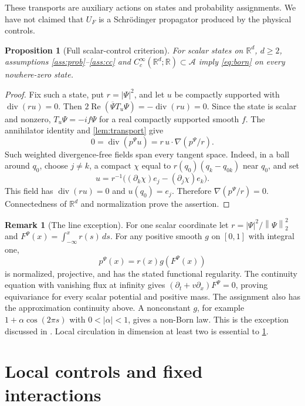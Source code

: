 \documentclass[11pt]{article}
\numberwithin{equation}{section}
\newtheorem{proposition}[proposition]{Proposition}
\theoremstyle{definition}
\newtheorem{remark}[remark]{Remark}
\newcommand{\R}{\mathbb R}
\newcommand{\Cc}{C_c^\infty}
\newcommand{\Acal}{\mathcal A}
\newcommand{\diver}{\operatorname{div}}
\newcommand{\norm}[1]{\left\|#1\right\|}
\begin{document}
These transports are auxiliary actions on states and probability assignments. We have not claimed that \(U_F\) is a Schr\"odinger propagator produced by the physical controls.

\begin{proposition}[Full scalar-control criterion]\label{prop:saturation}
For scalar states on \(\R^d\), \(d\ge2\), assumptions \ref{ass:prob}--\ref{ass:cc} and
\(\Cc(\R^d;\R)\subset\Acal\) imply \eqref{eq:born} on every nowhere-zero state.
\end{proposition}

\begin{proof}
Fix such a state, put \(r=|\Psi|^2\), and let \(u\) be compactly supported with \(\diver(ru)=0\). Then
\(2\operatorname{Re}(\overline\Psi T_u\Psi)=-\diver(ru)=0\).
Since the state is scalar and nonzero, \(T_u\Psi=-if\Psi\) for a real compactly supported smooth \(f\). The annihilator identity and \cref{lem:transport} give
\[
 0=\diver(p^\Psi u)=r\,u\cdot\nabla(p^\Psi/r).
\]
Such weighted divergence-free fields span every tangent space. Indeed, in a ball around \(q_0\), choose \(j\ne k\), a compact \(\chi\) equal to \(r(q_0)(q_k-q_{0k})\) near \(q_0\), and set
\[
 u=r^{-1}\big((\partial_k\chi)e_j-(\partial_j\chi)e_k\big).
\]
This field has \(\diver(ru)=0\) and \(u(q_0)=e_j\). Therefore \(\nabla(p^\Psi/r)=0\). Connectedness of \(\R^d\) and normalization prove the assertion.
\end{proof}

\begin{remark}[The line exception]\label{rem:line}
For one scalar coordinate let \(r=|\Psi|^2/\norm{\Psi}_2^2\) and
\(F^\Psi(x)=\int_{-\infty}^x r(s)\,ds\). For any positive smooth \(g\) on \([0,1]\) with integral one,
\[
 p^\Psi(x)=r(x)g(F^\Psi(x))
\]
is normalized, projective, and has the stated functional regularity. The continuity equation with vanishing flux at infinity gives
\((\partial_t+v\partial_x)F^\Psi=0\), proving equivariance for every scalar potential and positive mass. The assignment also has the approximation continuity above. A nonconstant \(g\), for example \(1+\alpha\cos(2\pi s)\) with \(0<|\alpha|<1\), gives a non-Born law. This is the exception discussed in \cite[Section 8]{GS2007}. Local circulation in dimension at least two is essential to \cref{prop:saturation}.
\end{remark}

\section{Local controls and fixed interactions}\label{sec:local}
\end{document}
